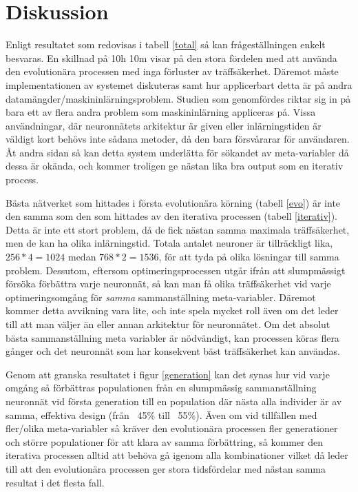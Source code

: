 \documentclass[a4paper, 12pt]{article}
\begin{document}
  \section{Diskussion}
  Enligt resultatet som redovisas i tabell \ref{total} så kan frågeställningen enkelt besvaras. En skillnad på 10h 10m visar på den stora fördelen med att använda den evolutionära processen med inga förluster av träffsäkerhet. Däremot måste implementationen av systemet diskuteras samt hur applicerbart detta är på andra datamängder/maskininlärningsproblem. Studien som genomfördes riktar sig in på bara ett av flera andra problem som maskininlärning appliceras på. Vissa användningar, där neuronnätets arkitektur är given eller inlärningstiden är väldigt kort behövs inte sådana metoder, då den bara försvårarar för användaren. Åt andra sidan så kan detta system underlätta för sökandet av meta-variabler då dessa är okända, och kommer troligen ge nästan lika bra output som en iterativ process.

  Bästa nätverket som hittades i första evolutionära körning (tabell \ref{evo}) är inte den samma som den som hittades av den iterativa processen (tabell \ref{iterativ}). Detta är inte ett stort problem, då de fick nästan samma maximala träffsäkerhet, men de kan ha olika inlärningstid. Totala antalet neuroner är tillräckligt lika, $256 * 4 = 1024$ medan $768 * 2 = 1536$, för att tyda på olika lösningar till samma problem. Dessutom, eftersom optimeringsprocessen utgår ifrån att slumpmässigt försöka förbättra varje neuronnät, så kan man få olika träffsäkerhet vid varje optimeringsomgång för \textit{samma} sammanställning meta-variabler. Däremot kommer detta avvikning vara lite, och inte spela mycket roll även om det leder till att man väljer än eller annan arkitektur för neuronnätet. Om det absolut bästa sammanställning meta variabler är nödvändigt, kan processen köras flera gånger och det neuronnät som har konsekvent bäst träffsäkerhet kan användas.

  Genom att granska resultatet i figur \ref{generation} kan det synas hur vid varje omgång så förbättras populationen från en slumpmässig sammanställning neuronnät vid första generation till en population där nästa alla individer är av samma, effektiva design (från ~45\% till ~55\%). Även om vid tillfällen med fler/olika meta-variabler så kräver den evolutionära processen fler generationer och större populationer för att klara av samma förbättring, så kommer den iterativa processen alltid att behöva gå igenom alla kombinationer vilket då leder till att den evolutionära processen ger stora tidsfördelar med nästan samma resultat i det flesta fall.
\end{document}
